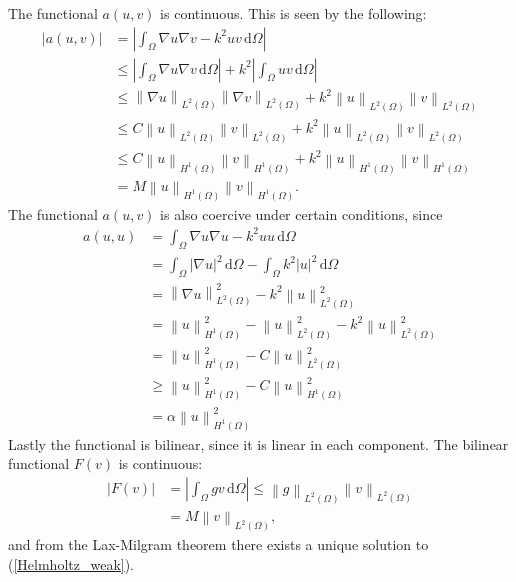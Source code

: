 \documentclass[10pt,a4paper]{article}
\newcommand{\vectornorm}[1]{\left\|#1\right\|}
\begin{document}
The functional $a(u,v)$ is continuous. This is seen by the following:
\begin{align*}
|a(u,v)| &= |\int_\Omega  \nabla u \nabla v - k^2 u v \, \mathrm{d} \Omega| \\
 		& \leq |\int_\Omega \nabla u \nabla v \, \mathrm{d} \Omega| + k^2 |\int_\Omega u v \, \mathrm{d} \Omega| \\
 		& \leq \vectornorm{\nabla u}_{L^2(\Omega)} \vectornorm{\nabla v}_{L^2(\Omega)} + k^2 \vectornorm{u}_{L^2(\Omega)} \vectornorm{v}_{L^2(\Omega)} \\
 		& \leq C \vectornorm{u}_{L^2(\Omega)} \vectornorm{v}_{L^2(\Omega)} + k^2 \vectornorm{u}_{L^2(\Omega)} \vectornorm{v}_{L^2(\Omega)} \\
 		& \leq C \vectornorm{u}_{H^1(\Omega)} \vectornorm{v}_{H^1(\Omega)} + k^2 \vectornorm{u}_{H^1(\Omega)} \vectornorm{v}_{H^1(\Omega)} \\
 		& = M \vectornorm{u}_{H^1(\Omega)} \vectornorm{v}_{H^1(\Omega)}.
\end{align*}
The functional $a(u,v)$ is also coercive under certain conditions, since
\begin{align*}
a(u,u) &= \int_\Omega  \nabla u \nabla u - k^2 u u \, \mathrm{d} \Omega \\
 		& = \int_\Omega  |\nabla u|^2 \, \mathrm{d} \Omega - \int_{\Omega} k^2 |u|^2 \, \mathrm{d} \Omega \\
 		& =  \vectornorm{\nabla u}_{L^2(\Omega)}^2 - k^2 \vectornorm{u}_{L^2(\Omega)}^2\\
 		& = \vectornorm{u}_{H^1(\Omega)}^2 - \vectornorm{u}_{L^2(\Omega)}^2 - k^2 \vectornorm{u}_{L^2(\Omega)}^2\\
 		& = \vectornorm{u}_{H^1(\Omega)}^2 - C \vectornorm{u}_{L^2(\Omega)}^2\\
 		& \geq \vectornorm{u}_{H^1(\Omega)}^2 - C \vectornorm{u}_{H^1(\Omega)}^2\\
 		& = \alpha \vectornorm{u}_{H^1(\Omega)}^2
\end{align*}
Lastly the functional is bilinear, since it is linear in each component. The bilinear functional $F(v)$ is continuous:
\begin{align*}
|F(v)| &= |\int_\Omega gv \, \mathrm{d} \Omega| \leq \vectornorm{g}_{L^2(\Omega)} \vectornorm{v}_{L^2(\Omega)} \\
       &= M \vectornorm{v}_{L^2(\Omega)},
\end{align*}
and from the Lax-Milgram theorem there exists a unique solution to (\ref{Helmholtz_weak}).
\end{document}
